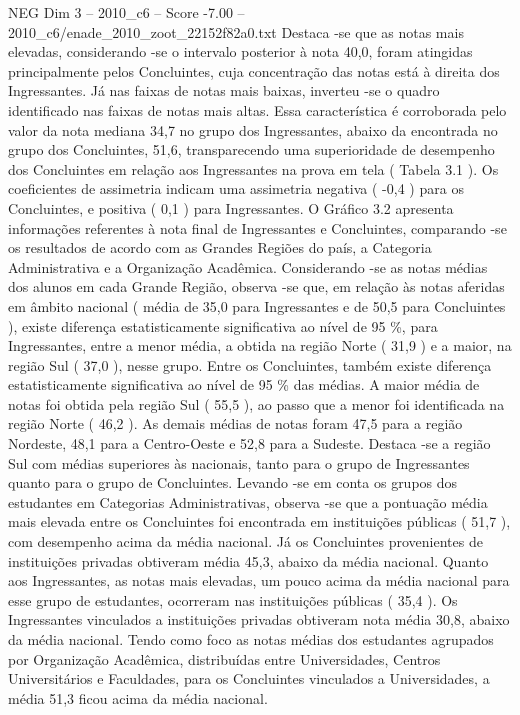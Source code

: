 \begin{textsample}{NEG Dim 3 – 2010\_c6 – Score -7.00 – 2010\_c6/enade\_2010\_zoot\_22152f82a0.txt}
Destaca -se que as notas mais elevadas, considerando -se o intervalo posterior à nota 40,0, foram atingidas principalmente pelos Concluintes, cuja concentração das notas está à direita dos Ingressantes.
Já nas faixas de notas mais baixas, inverteu -se o quadro identificado nas faixas de notas mais altas.
Essa característica é corroborada pelo valor da nota mediana 34,7 no grupo dos Ingressantes, abaixo da encontrada no grupo dos Concluintes, 51,6, transparecendo uma superioridade de desempenho dos Concluintes em relação aos Ingressantes na prova em tela ( Tabela 3.1 ).
Os coeficientes de assimetria indicam uma assimetria negativa ( -0,4 ) para os Concluintes, e positiva ( 0,1 ) para Ingressantes.
O Gráfico 3.2 apresenta informações referentes à nota final de Ingressantes e Concluintes, comparando -se os resultados de acordo com as Grandes Regiões do país, a Categoria Administrativa e a Organização Acadêmica.
Considerando -se as notas médias dos alunos em cada Grande Região, observa -se que, em relação às notas aferidas em âmbito nacional ( média de 35,0 para Ingressantes e de 50,5 para Concluintes ), existe diferença estatisticamente significativa ao nível de 95 \%, para Ingressantes, entre a menor média, a obtida na região Norte ( 31,9 ) e a maior, na região Sul ( 37,0 ), nesse grupo.
Entre os Concluintes, também existe diferença estatisticamente significativa ao nível de 95 \% das médias.
A maior média de notas foi obtida pela região Sul ( 55,5 ), ao passo que a menor foi identificada na região Norte ( 46,2 ).
As demais médias de notas foram 47,5 para a região Nordeste, 48,1 para a Centro-Oeste e 52,8 para a Sudeste.
Destaca -se a região Sul com médias superiores às nacionais, tanto para o grupo de Ingressantes quanto para o grupo de Concluintes.
Levando -se em conta os grupos dos estudantes em Categorias Administrativas, observa -se que a pontuação média mais elevada entre os Concluintes foi encontrada em instituições públicas ( 51,7 ), com desempenho acima da média nacional.
Já os Concluintes provenientes de instituições privadas obtiveram média 45,3, abaixo da média nacional.
Quanto aos Ingressantes, as notas mais elevadas, um pouco acima da média nacional para esse grupo de estudantes, ocorreram nas instituições públicas ( 35,4 ).
Os Ingressantes vinculados a instituições privadas obtiveram nota média 30,8, abaixo da média nacional.
Tendo como foco as notas médias dos estudantes agrupados por Organização Acadêmica, distribuídas entre Universidades, Centros Universitários e Faculdades, para os Concluintes vinculados a Universidades, a média 51,3 ficou acima da média nacional.

\end{textsample}
